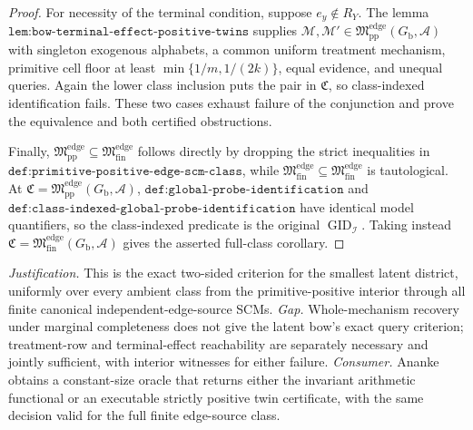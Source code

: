 \documentclass{article}
\begin{document}
\begin{proof}
For necessity of the terminal condition, suppose \(e_y\notin R_Y\).  The lemma \(\texttt{lem:bow-terminal-effect-positive-twins}\) supplies \(\mathcal M,\mathcal M'\in\mathfrak M_{\mathrm{pp}}^{\mathrm{edge}}(G_{\mathrm b},\mathcal A)\) with singleton exogenous alphabets, a common uniform treatment mechanism, primitive cell floor at least \(\min\{1/m,1/(2k)\}\), equal evidence, and unequal queries.  Again the lower class inclusion puts the pair in \(\mathfrak C\), so class-indexed identification fails.  These two cases exhaust failure of the conjunction and prove the equivalence and both certified obstructions.

Finally, \(\mathfrak M_{\mathrm{pp}}^{\mathrm{edge}}\subseteq\mathfrak M_{\mathrm{fin}}^{\mathrm{edge}}\) follows directly by dropping the strict inequalities in \(\texttt{def:primitive-positive-edge-scm-class}\), while \(\mathfrak M_{\mathrm{fin}}^{\mathrm{edge}}\subseteq\mathfrak M_{\mathrm{fin}}^{\mathrm{edge}}\) is tautological.  At \(\mathfrak C=\mathfrak M_{\mathrm{pp}}^{\mathrm{edge}}(G_{\mathrm b},\mathcal A)\), \(\texttt{def:global-probe-identification}\) and \(\texttt{def:class-indexed-global-probe-identification}\) have identical model quantifiers, so the class-indexed predicate is the original \(\operatorname{GID}_{\mathcal I}\).  Taking instead \(\mathfrak C=\mathfrak M_{\mathrm{fin}}^{\mathrm{edge}}(G_{\mathrm b},\mathcal A)\) gives the asserted full-class corollary.
\end{proof}
\par\smallskip\noindent \textit{Justification.} This is the exact two-sided criterion for the smallest latent district, uniformly over every ambient class from the primitive-positive interior through all finite canonical independent-edge-source SCMs. \textit{Gap.} Whole-mechanism recovery under marginal completeness does not give the latent bow's exact query criterion; treatment-row and terminal-effect reachability are separately necessary and jointly sufficient, with interior witnesses for either failure. \textit{Consumer.} Ananke obtains a constant-size oracle that returns either the invariant arithmetic functional or an executable strictly positive twin certificate, with the same decision valid for the full finite edge-source class.
\end{document}
